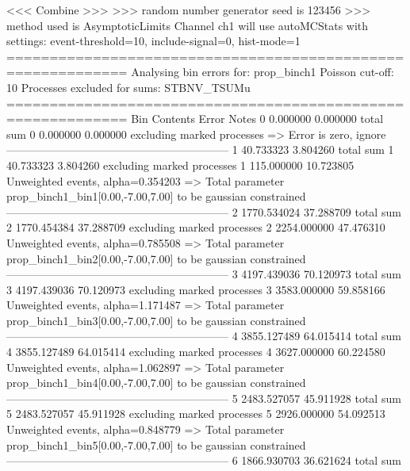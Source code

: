  <<< Combine >>> 
>>> random number generator seed is 123456
>>> method used is AsymptoticLimits
Channel ch1 will use autoMCStats with settings: event-threshold=10, include-signal=0, hist-mode=1
============================================================
Analysing bin errors for: prop_binch1
Poisson cut-off: 10
Processes excluded for sums: STBNV_TSUMu
============================================================
Bin        Contents        Error           Notes                         
0          0.000000        0.000000        total sum                     
0          0.000000        0.000000        excluding marked processes    
  => Error is zero, ignore      
------------------------------------------------------------
1          40.733323       3.804260        total sum                     
1          40.733323       3.804260        excluding marked processes    
1          115.000000      10.723805       Unweighted events, alpha=0.354203
  => Total parameter prop_binch1_bin1[0.00,-7.00,7.00] to be gaussian constrained
------------------------------------------------------------
2          1770.534024     37.288709       total sum                     
2          1770.454384     37.288709       excluding marked processes    
2          2254.000000     47.476310       Unweighted events, alpha=0.785508
  => Total parameter prop_binch1_bin2[0.00,-7.00,7.00] to be gaussian constrained
------------------------------------------------------------
3          4197.439036     70.120973       total sum                     
3          4197.439036     70.120973       excluding marked processes    
3          3583.000000     59.858166       Unweighted events, alpha=1.171487
  => Total parameter prop_binch1_bin3[0.00,-7.00,7.00] to be gaussian constrained
------------------------------------------------------------
4          3855.127489     64.015414       total sum                     
4          3855.127489     64.015414       excluding marked processes    
4          3627.000000     60.224580       Unweighted events, alpha=1.062897
  => Total parameter prop_binch1_bin4[0.00,-7.00,7.00] to be gaussian constrained
------------------------------------------------------------
5          2483.527057     45.911928       total sum                     
5          2483.527057     45.911928       excluding marked processes    
5          2926.000000     54.092513       Unweighted events, alpha=0.848779
  => Total parameter prop_binch1_bin5[0.00,-7.00,7.00] to be gaussian constrained
------------------------------------------------------------
6          1866.930703     36.621624       total sum                     
